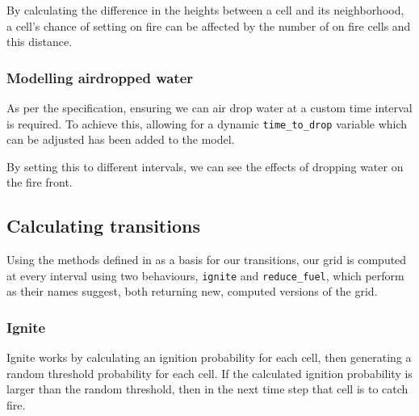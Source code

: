\documentclass[11pt, a4paper, titlepage]{article}
\newcommand{\code}[1]{\colorbox{light-gray}{\texttt{#1}}}
\begin{document}
By calculating the difference in the heights between a cell and its neighborhood, a cell's chance of setting on fire can be affected by the number of on fire cells and this distance.

\subsubsection{Modelling airdropped water}
As per the specification, ensuring we can air drop water at a custom time interval is required. To achieve this, allowing for a dynamic \code{time\_to\_drop} variable which can be adjusted has been added to the model.

By setting this to different intervals, we can see the effects of dropping water on the fire front.

\subsection{Calculating transitions}

Using the methods defined in \cite{ALEXANDRIDIS2008191} as a basis for our transitions, our grid is computed at every interval using two behaviours, \code{ignite} and \code{reduce\_fuel}, which perform as their names suggest, both returning new, computed versions of the grid.

\subsubsection{Ignite}






Ignite works by calculating an ignition probability for each cell, then generating a random threshold probability for each cell. If the calculated ignition probability is larger than the random threshold, then in the next time step that cell is to catch fire.
\end{document}
